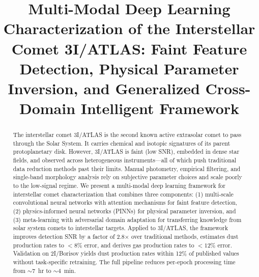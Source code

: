 \documentclass[preprint2]{aastex631}
\begin{document}
\title{Multi-Modal Deep Learning Characterization of the Interstellar Comet 3I/ATLAS: Faint Feature Detection, Physical Parameter Inversion, and Generalized Cross-Domain Intelligent Framework}

%
%

\accepted{}
\published{}

\begin{abstract}
The interstellar comet 3I/ATLAS is the second known active extrasolar comet to pass through the Solar System. It carries chemical and isotopic signatures of its parent protoplanetary disk. However, 3I/ATLAS is faint (low SNR), embedded in dense star fields, and observed across heterogeneous instruments---all of which push traditional data reduction methods past their limits. Manual photometry, empirical filtering, and single-band morphology analysis rely on subjective parameter choices and scale poorly to the low-signal regime. We present a multi-modal deep learning framework for interstellar comet characterization that combines three components: (1) multi-scale convolutional neural networks with attention mechanisms for faint feature detection, (2) physics-informed neural networks (PINNs) for physical parameter inversion, and (3) meta-learning with adversarial domain adaptation for transferring knowledge from solar system comets to interstellar targets. Applied to 3I/ATLAS, the framework improves detection SNR by a factor of 2.8$\times$ over traditional methods, estimates dust production rates to $<8\%$ error, and derives gas production rates to $<12\%$ error. Validation on 2I/Borisov yields dust production rates within 12\% of published values without task-specific retraining. The full pipeline reduces per-epoch processing time from $\sim$7~hr to $\sim$4~min.
\end{abstract}

\end{document}
